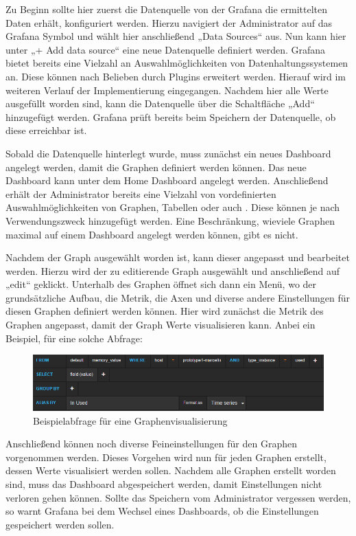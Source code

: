 Zu Beginn sollte hier zuerst die Datenquelle von der Grafana die ermittelten
Daten erhält, konfiguriert werden. Hierzu navigiert der Administrator auf das
Grafana Symbol und wählt hier anschließend „Data Sources“ aus. Nun kann hier
unter „+ Add data source“ eine neue Datenquelle definiert werden. Grafana
bietet bereits eine Vielzahl an Auswahlmöglichkeiten von Datenhaltungssystemen
an. Diese können nach Belieben durch Plugins erweitert werden. Hierauf wird im
weiteren Verlauf der Implementierung eingegangen. Nachdem hier alle Werte
ausgefüllt worden sind, kann die Datenquelle über die Schaltfläche „Add“
hinzugefügt werden. Grafana prüft bereits beim Speichern der Datenquelle, ob
diese erreichbar ist.

Sobald die Datenquelle hinterlegt wurde, muss zunächst ein neues Dashboard
angelegt werden, damit die Graphen definiert werden können. Das neue Dashboard
kann unter dem Home Dashboard angelegt werden. Anschließend erhält der
Administrator bereits eine Vielzahl von vordefinierten Auswahlmöglichkeiten von
Graphen, Tabellen oder auch . Diese können je
nach Verwendungszweck hinzugefügt werden. Eine Beschränkung, wieviele Graphen
maximal auf einem Dashboard angelegt werden können, gibt es nicht.

Nachdem der Graph ausgewählt worden ist, kann dieser angepasst und bearbeitet
werden. Hierzu wird der zu editierende Graph ausgewählt und anschließend auf
„edit“ geklickt. Unterhalb des Graphen öffnet sich dann ein Menü, wo der
grundsätzliche Aufbau, die Metrik, die Axen und diverse andere Einstellungen
für diesen Graphen definiert werden können. Hier wird zunächst die Metrik des
Graphen angepasst, damit der Graph Werte visualisieren kann. Anbei ein
Beispiel, für eine solche Abfrage:

\begin{figure}[h]
  \centering
  \includegraphics[width=1.0\textwidth]{../figures/graph.png}
  \caption{Beispielabfrage für eine Graphenvisualisierung}
\label{figure:graph}
\end{figure}

Anschließend können noch diverse Feineinstellungen für den Graphen vorgenommen
werden. Dieses Vorgehen wird nun für jeden Graphen erstellt, dessen Werte
visualisiert werden sollen. Nachdem alle Graphen erstellt worden sind, muss das
Dashboard abgespeichert werden, damit Einstellungen nicht verloren gehen
können. Sollte das Speichern vom Administrator vergessen werden, so warnt
Grafana bei dem Wechsel eines Dashboards, ob die Einstellungen gespeichert
werden sollen.

